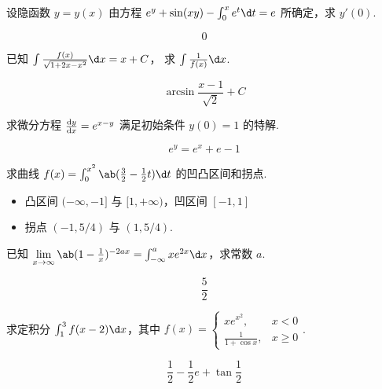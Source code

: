 \documentclass[quiet]{ctexart}
\begin{document}
\begin{problem}
  设隐函数 $y = y(x)$ 由方程 $e^y + \sin(xy) - \int_0^x e^t \d t = e$
  所确定，求 $y'(0)$.
\end{problem}
\begin{solution}
  \[0\]
\end{solution}

\begin{problem}
  已知 $\int \frac{f(x)}{\sqrt{1 + 2x - x^2}} \d x = x + C$，
  求 $\int \frac{1}{f(x)} \d x$.
\end{problem}
\begin{solution}
  \[\arcsin \frac{x - 1}{\sqrt 2} + C\]
\end{solution}

\begin{problem}
  求微分方程 $\odv yx = e^{x - y}$ 满足初始条件 $y(0) = 1$ 的特解.
\end{problem}
\begin{solution}
  \[e^y = e^x + e - 1\]
\end{solution}

\begin{problem}
  求曲线 $f(x) = \int_0^{x^2} \ab(\frac32 - \frac12t) \d t$ 的凹凸区间和拐点.
\end{problem}
\begin{solution} \leavevmode
  \begin{itemize}
    \item 凸区间 $(-\infty, -1]$ 与 $[1, +\infty)$，凹区间 $[-1,1]$
    \item 拐点 $(-1,5/4)$ 与 $(1,5/4)$.
  \end{itemize}
\end{solution}

\begin{problem}
  已知 $ \lim\limits_{x \to \infty} \ab(1 - \frac1x)^{-2ax}
      = \int_{-\infty}^a xe^{2x} \d x$，求常数 $a$.
\end{problem}
\begin{solution}
  \[\frac52\]
\end{solution}

\begin{problem}
  求定积分 $\int_1^3 f(x - 2) \d x$，其中 $f(x) =
  \begin{cases}
    xe^{x^2},             & x < 0\\
    \frac{1}{1 + \cos x}, & x \geq 0
  \end{cases}$.
\end{problem}
\begin{solution}
  \[\frac12 - \frac12e + \tan\frac12\]
\end{solution}
\end{document}
